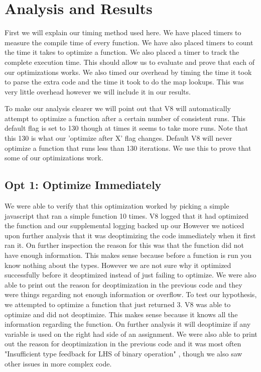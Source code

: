 \documentclass[twocolumn,showpacs,%
  nofootinbib,aps,superscriptaddress,%
  eqsecnum,prd,notitlepage,showkeys,10pt]{revtex4-1}
\begin{document}
\section{Analysis and Results}
First we will explain our timing method used here. We have placed timers to measure the compile time of every function. We have also placed timers to count the time it takes to optimize a function. We also placed a timer to track the complete execution time. This should allow us to evaluate and prove that each of our optimizations works. We also timed our overhead by timing the time it took to parse the extra code and the time it took to do the map lookups. This was very little overhead however we will include it in our results.

To make our analysis clearer we will point out that V8 will automatically attempt to optimize a function after a certain number of consistent runs. This default flag is set to 130 though at times it seems to take more runs. Note that this 130 is what our 'optimize after X' flag changes. Default V8 will never optimize a function that runs less than 130 iterations. We use this to prove that some of our optimizations work.

\subsection{Opt 1: Optimize Immediately}
We were able to verify that this optimization worked by picking a simple javascript that ran a simple function 10 times. V8 logged that it had optimized the function and our supplemental logging backed up our  However we noticed upon further analysis that it was deoptimizing the code immediately when it first ran it. On further inspection the reason for this was that the function did not have enough information. This makes sense because before a function is run you know nothing about the types. However we are not sure why it optimized successfully before it deoptimized instead of just failing to optimize. We were also able to print out the reason for deoptimization in the previous code and they were things regarding not enough information or overflow. To test our hypothesis, we attempted to optimize a function that just returned 3. V8 was able to optimize and did not deoptimize. This makes sense because it knows all the information regarding the function. On further analysis it will deoptimize if any variable is used on the right had side of an assignment. We were also able to print out the reason for deoptimization in the previous code and it was most often "Insufficient type feedback for LHS of binary operation" , though we also saw other issues in more complex code.
\end{document}

